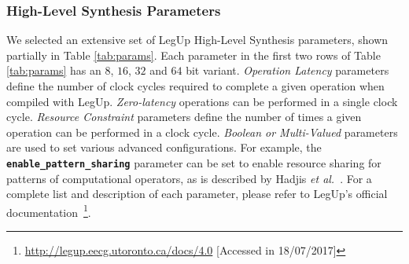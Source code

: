 \subsubsection{High-Level Synthesis Parameters}

We selected an extensive set of LegUp High-Level Synthesis parameters, shown
partially in Table \ref{tab:params}. Each parameter in the first two rows of
Table \ref{tab:params} has an $8$, $16$, $32$ and $64$ bit variant.
\textit{Operation Latency} parameters define the number of clock cycles
required to complete a given operation when compiled with LegUp.
\textit{Zero-latency} operations can be performed in a single clock cycle.
\textit{Resource Constraint} parameters define the number of times a given
operation can be performed in a clock cycle.  \textit{Boolean or Multi-Valued}
parameters are used to set various advanced configurations. For example, the
\textbf{\texttt{\small{enable\_pattern\_sharing}}} parameter can be set to
enable resource sharing for patterns of computational operators, as is
described by Hadjis \emph{et al.}~\cite{hadjis2012impact}.  For a complete list
and description of each parameter, please refer to LegUp's official
documentation~\footnote{\url{http://legup.eecg.utoronto.ca/docs/4.0} [Accessed
in 18/07/2017]}.


